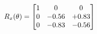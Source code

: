 \documentclass[preview]{standalone}
\begin{document}
\begin{align*}
\special{dvisvgm:raw <g id='unique000'>}R_{x}(\theta) = \begin{bmatrix}1 & 0 & 0 \\0 & -0.56 & +0.83 \\0 & -0.83 & -0.56\end{bmatrix}\special{dvisvgm:raw </g>}
\end{align*}
\end{document}
